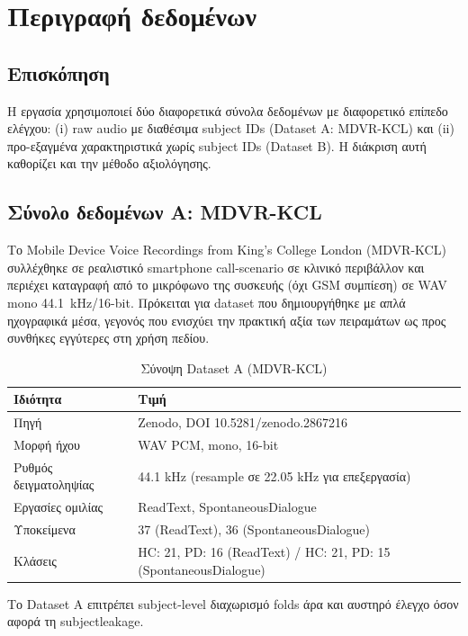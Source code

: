 \chapter{Περιγραφή δεδομένων}
\label{ch:data-description}

\section{Επισκόπηση}

Η εργασία χρησιμοποιεί δύο διαφορετικά σύνολα δεδομένων με διαφορετικό επίπεδο ελέγχου: 
(i) raw audio με διαθέσιμα subject IDs (Dataset A: MDVR-KCL) και 
(ii) προ-εξαγμένα χαρακτηριστικά χωρίς subject IDs (Dataset B). 
Η διάκριση αυτή καθορίζει και την μέθοδο αξιολόγησης.

\section{Σύνολο δεδομένων Α: MDVR-KCL}

Το Mobile Device Voice Recordings from King's College London (MDVR-KCL)~\cite{mdvr_kcl_2019} συλλέχθηκε σε ρεαλιστικό smartphone call-scenario σε κλινικό περιβάλλον και περιέχει καταγραφή από το μικρόφωνο της συσκευής (όχι GSM συμπίεση) σε WAV mono 44.1~kHz/16-bit. 
Πρόκειται για dataset που δημιουργήθηκε με απλά ηχογραφικά μέσα, γεγονός που ενισχύει την πρακτική αξία των πειραμάτων ως προς συνθήκες εγγύτερες στη χρήση πεδίου.

\begin{table}[H]
\centering
\begin{tabular}{@{}ll@{}}
\toprule
\textbf{Ιδιότητα} & \textbf{Τιμή} \\
\midrule
Πηγή & Zenodo, DOI 10.5281/zenodo.2867216 \\
Μορφή ήχου & WAV PCM, mono, 16-bit \\
Ρυθμός δειγματοληψίας & 44.1 kHz (resample σε 22.05 kHz για επεξεργασία) \\
Εργασίες ομιλίας & ReadText, SpontaneousDialogue \\
Υποκείμενα & 37 (ReadText), 36 (SpontaneousDialogue) \\
Κλάσεις & HC: 21, PD: 16 (ReadText) / HC: 21, PD: 15 (SpontaneousDialogue) \\
\bottomrule
\end{tabular}
\caption{Σύνοψη Dataset A (MDVR-KCL)}
\label{tab:dataset-a-summary}
\end{table}

Το Dataset A επιτρέπει subject-level διαχωρισμό folds άρα και αυστηρό έλεγχο όσον αφορά τη \gls{subjectleakage}. 

